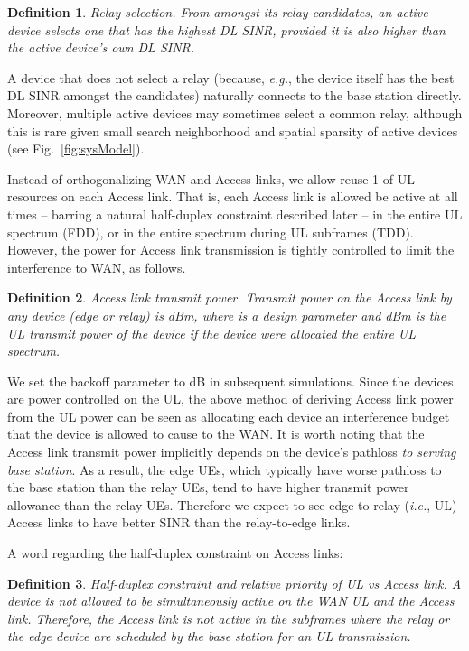 \documentclass[journal]{IEEEtran}
\newtheorem{definit}{Definition}
\newcommand{\ie}{\emph{i.e.}}
\newcommand{\eg}{\emph{e.g.}}
\begin{document}
\begin{definit}\label{def:rlySelect}
	{\em Relay selection.} From amongst its relay candidates, an active device selects one that has the highest DL SINR, provided it is also higher than the active device's own DL SINR.
\end{definit}

A device that does not select a relay (because, \eg, the device itself has the best DL SINR amongst the candidates) naturally connects to the base station directly.  Moreover, multiple active devices may sometimes select a common relay, although this is rare given small search neighborhood and spatial sparsity of active devices (see Fig.~\ref{fig:sysModel}).

Instead of orthogonalizing WAN and Access links, we allow reuse 1 of UL resources on each Access link.  That is, each Access link is allowed be active at all times -- barring a natural half-duplex constraint described later -- in the entire UL spectrum (FDD), or in the entire spectrum during UL subframes (TDD).  However, the power for Access link transmission is tightly controlled to limit the interference to WAN, as follows.

\begin{definit}\label{def:txPower}
	{\em Access link transmit power.} Transmit power on the Access link by any device (edge or relay) is  dBm, where  is a design parameter and  dBm is the UL transmit power of the device if the device were allocated the entire UL spectrum.
\end{definit}

We set the backoff parameter  to dB in subsequent simulations. Since the devices are power controlled on the UL, the above method of deriving Access link power from the UL power can be seen as allocating each device an interference budget that the device is allowed to cause to the WAN. It is worth noting that the Access link transmit power implicitly depends on the device's pathloss {\em to serving  base station}.  As a result, the edge UEs, which typically have worse pathloss to the base station than the relay UEs, tend to have higher transmit power allowance than the relay UEs. Therefore we expect to see edge-to-relay (\ie, UL) Access links to have better SINR than the relay-to-edge links.

A word regarding the half-duplex constraint on Access links:
\begin{definit}
    {\em Half-duplex constraint and relative priority of UL vs Access link.} A device is not allowed to be simultaneously active on the WAN UL and the Access link. Therefore, the Access link is not active in the subframes where the relay or the edge device are scheduled by the base station for an UL transmission.
\end{definit}
\end{document}

